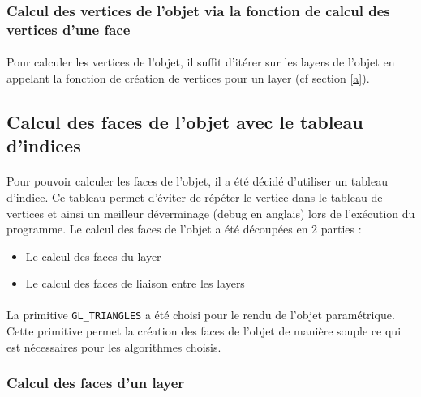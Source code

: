 \documentclass[article, backcover, french, nodocumentinfo]{upmethodology-document}
\begin{document}
	\subsubsection{Calcul des vertices de l'objet via la fonction de calcul des vertices d'une face}
	\paragraph{} Pour calculer les vertices de l'objet, il suffit d'itérer sur les layers de l'objet en appelant la fonction de création de vertices pour un layer (cf section \ref{a}).
	\subsection{Calcul des faces de l'objet avec le tableau d'indices}
	\paragraph{}Pour pouvoir calculer les faces de l'objet, il a été décidé d'utiliser un tableau d'indice. Ce tableau permet d'éviter de répéter le vertice dans le tableau de vertices et ainsi un meilleur déverminage (debug en anglais) lors de l'exécution du programme. Le calcul des faces de l'objet a été découpées en 2 parties :
	\begin{itemize}
		\item Le calcul des faces du layer
		\item Le calcul des faces de liaison entre les layers
	\end{itemize}
	\paragraph{} La primitive \texttt{GL\_TRIANGLES} a été choisi pour le rendu de l'objet paramétrique. Cette primitive permet la création des faces de l'objet de manière souple ce qui est nécessaires pour les algorithmes choisis.
	\subsubsection{Calcul des faces d'un layer}
\end{document}
